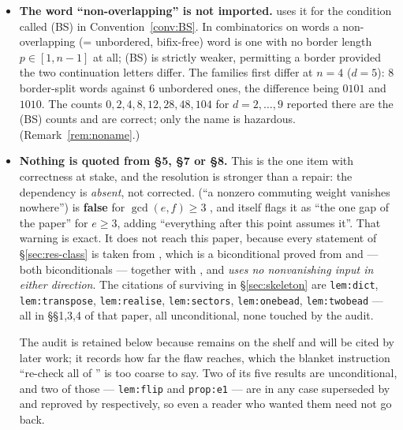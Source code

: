\documentclass[11pt]{article}
\theoremstyle{definition}
\theoremstyle{remark}
\begin{document}
\begin{itemize}
\item[\textbf{(P1)}] \textbf{The word ``non-overlapping'' is not imported.}
  \cite[\texttt{def:border}]{Q150c2} uses it for the condition called (BS) in
  Convention~\ref{conv:BS}.  In combinatorics on words a non-overlapping (= unbordered,
  bifix-free) word is one with no border length $p\in[1,n-1]$ at all; (BS) is strictly weaker,
  permitting a border provided the two continuation letters differ.  The families first differ
  at $n=4$ ($d=5$): $8$ border-split words against $6$ unbordered ones, the difference being
  $0101$ and $1010$.  The counts $0,2,4,8,12,28,48,104$ for $d=2,\dots,9$ reported there are
  the (BS) counts and are correct; only the name is hazardous.
  (Remark~\ref{rem:noname}.)

\item[\textbf{(P2)}] \textbf{Nothing is quoted from \cite{Q149} \S5, \S7 or \S8.}  This is the
  one item with correctness at stake, and the resolution is stronger than a repair: the
  dependency is \emph{absent}, not corrected.  \cite[\texttt{lem:nonvanish}]{Q149} (``a nonzero
  commuting weight vanishes nowhere'') is \textbf{false} for $\gcd(e,f)\ge3$
  \cite[\texttt{cor:main0}]{Q150c1}, and \cite{Q149} itself flags it as ``the one gap of the
  paper'' for $e\ge3$, adding ``everything after this point assumes it''.  That warning is
  exact.  It does not reach this paper, because every statement of
  \S\ref{sec:res-class} is taken from \cite[\texttt{thm:main0}]{Q150c1}, which is a
  biconditional proved from \cite[\texttt{prop:1B}]{Q150c1} and
  \cite[\texttt{prop:2B}]{Q150c1} --- both biconditionals --- together with
  \cite[\texttt{lem:sectors}]{Q149}, and \emph{uses no nonvanishing input in either
  direction}.  The citations of \cite{Q149} surviving in \S\ref{sec:skeleton} are
  \texttt{lem:dict}, \texttt{lem:transpose}, \texttt{lem:realise}, \texttt{lem:sectors},
  \texttt{lem:onebead}, \texttt{lem:twobead} --- all in \S\S1,3,4 of that paper, all
  unconditional, none touched by the audit.

  \smallskip
  The audit is retained below because \cite{Q149} remains on the shelf and will be cited by
  later work; it records how far the flaw reaches, which the blanket instruction ``re-check all
  of \cite[\S8]{Q149}'' is too coarse to say.  Two of its five results are unconditional, and
  two of those --- \texttt{lem:flip} and \texttt{prop:e1} --- are in any case superseded by
  \cite[\texttt{prop:1B}]{Q150c1} and reproved by \cite[\texttt{cor:coprime}]{Q150c1}
  respectively, so even a reader who wanted them need not go back.


\end{itemize}
\end{document}

